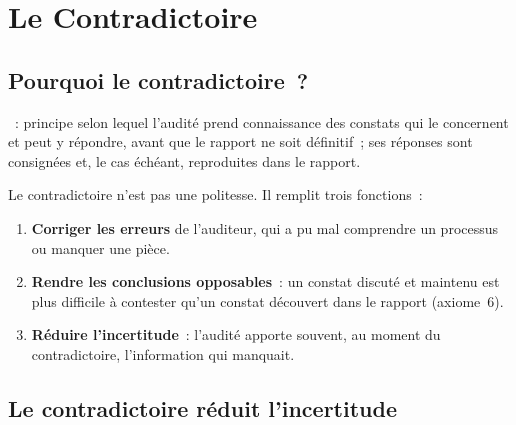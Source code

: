 \section{Le Contradictoire}
\label{sec:c07-contradictoire}

\subsection{Pourquoi le contradictoire~?}

\begin{boxdef}
~: principe selon lequel
l'audité prend connaissance des constats qui le concernent et peut y
répondre, avant que le rapport ne soit définitif~; ses réponses sont
consignées et, le cas échéant, reproduites dans le rapport.
\end{boxdef}

Le contradictoire n'est pas une politesse. Il remplit trois fonctions~:
\begin{enumerate}
    \item \textbf{Corriger les erreurs} de l'auditeur, qui a pu mal
          comprendre un processus ou manquer une pièce.
    \item \textbf{Rendre les conclusions opposables}~: un constat discuté et
          maintenu est plus difficile à contester qu'un constat découvert
          dans le rapport (axiome~6).
    \item \textbf{Réduire l'incertitude}~: l'audité apporte souvent, au
          moment du contradictoire, l'information qui manquait.
\end{enumerate}

\subsection{Le contradictoire réduit l'incertitude}

